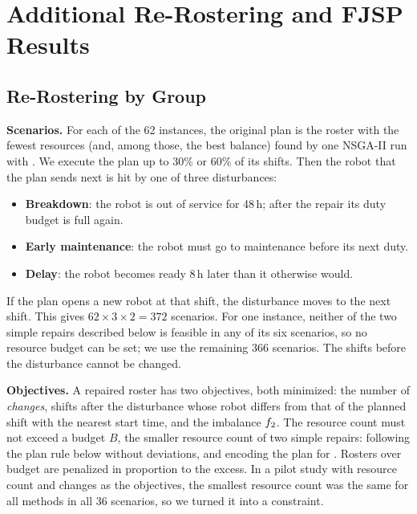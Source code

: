 \documentclass[journal]{IEEEtran}
\begin{document}
\section{Additional Re-Rostering and FJSP Results}
\label{sec:s-more}

\subsection{Re-Rostering by Group}
\textbf{Scenarios.}
For each of the 62 instances, the original plan is the roster with the fewest resources (and, among those, the best balance) found by one NSGA-II run with .
We execute the plan up to 30\% or 60\% of its shifts.
Then the robot that the plan sends next is hit by one of three disturbances:
\begin{itemize}
  \item \textbf{Breakdown}: the robot is out of service for 48\,h; after the repair its duty budget is full again.
  \item \textbf{Early maintenance}: the robot must go to maintenance before its next duty.
  \item \textbf{Delay}: the robot becomes ready 8\,h later than it otherwise would.
\end{itemize}
If the plan opens a new robot at that shift, the disturbance moves to the next shift.
This gives $62 \times 3 \times 2 = 372$ scenarios.
For one instance, neither of the two simple repairs described below is feasible in any of its six scenarios, so no resource budget can be set; we use the remaining 366 scenarios.
The shifts before the disturbance cannot be changed.

\textbf{Objectives.}
A repaired roster has two objectives, both minimized:
the number of \emph{changes}, \ie shifts after the disturbance whose robot differs from that of the planned shift with the nearest start time,
and the imbalance $f_{2}$.
The resource count must not exceed a budget $B$, the smaller resource count of two simple repairs:
following the plan rule below without deviations, and encoding the plan for .
Rosters over budget are penalized in proportion to the excess.
In a pilot study with resource count and changes as the objectives, the smallest resource count was the same for all methods in all 36 scenarios,
so we turned it into a constraint.
\end{document}
